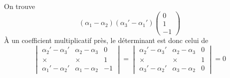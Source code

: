 On trouve
\begin{displaymath}
(\alpha_1-\alpha_2)(\alpha_3'-\alpha_1')
 \begin{pmatrix}
  0\\ 1 \\ -1
 \end{pmatrix}
\end{displaymath}
\`A un coefficient multiplicatif près, le déterminant est donc celui de
\begin{displaymath}
 \begin{vmatrix}
  \alpha_2'-\alpha_3' & \alpha_2 - \alpha_3 & 0 \\
 \times & \times & 1 \\
 \alpha_1'-\alpha_2' & \alpha_1 - \alpha_2 & -1
 \end{vmatrix}
=
 \begin{vmatrix}
  \alpha_2'-\alpha_3' & \alpha_2 - \alpha_3 & 0 \\
 \times & \times & 1 \\
 \alpha_3'-\alpha_2' & \alpha_3 - \alpha_2 & 0
 \end{vmatrix}
=0
\end{displaymath}
